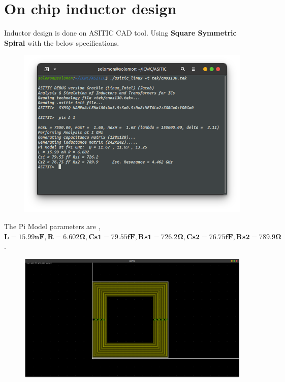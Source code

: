 \documentclass{article}
\begin{document}
\section*{\hfil On chip inductor design}
Inductor design is done on ASITIC CAD tool. Using \textbf{Square Symmetric Spiral} with the below specifications.\\
\begin{figure}[H]
	\centering
	\includegraphics[scale=0.5]{./figs/pix.png}
\end{figure}
The Pi Model parameters are ,\\
$\mathbf{L=15.99nF, R=6.602\si{\ohm}, Cs1=79.55fF, Rs1=726.2\si{\ohm}, Cs2=76.75fF, Rs2=789.9\si{\ohm}}$.
\begin{figure}[H]
	\centering
	\includegraphics[scale=0.3]{./figs/ind.png}
\end{figure}
\end{document}

